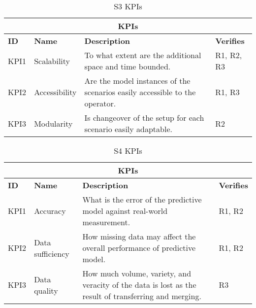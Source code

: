 \begin{table}[hbt!]
\centering
\begin{tabularx}{\textwidth}{|p{1cm}|p{2cm}|X|p{2cm}|}
\hline
\multicolumn{4}{|c|}{\textbf{KPIs}} \\ 
\hline
\textbf{ID} & \textbf{Name} & \textbf{Description} & \textbf{Verifies} \\ 
\hline
KPI1 & Scalability & To what extent are the additional space and time bounded. & R1, R2, R3 \\ 
\hline
KPI2 & Accessibility & Are the model instances of the scenarios easily accessible to the operator. & R1, R3 \\ 
\hline
KPI3 & Modularity & Is changeover of the setup for each scenario easily adaptable. & R2 \\ 
\hline
\end{tabularx}
\caption{S3 KPIs}
\label{tab:s3kpi}
\end{table}

\begin{table}[hbt!]
\centering
\begin{tabularx}{\textwidth}{|p{1cm}|p{2.5cm}|X|p{1.5cm}|}
\hline
\multicolumn{4}{|c|}{\textbf{KPIs}} \\ 
\hline
\textbf{ID} & \textbf{Name} & \textbf{Description} & \textbf{Verifies} \\ 
\hline
KPI1 & Accuracy & What is the error of the predictive model against real-world measurement. & R1, R2 \\ 
\hline
KPI2 & Data sufficiency & How missing data may affect the overall performance of predictive model. & R1, R2 \\ 
\hline
KPI3 & Data quality & How much volume, variety, and veracity of the data is lost as the result of transferring
and merging. & R3 \\ 
\hline
\end{tabularx}
\caption{S4 KPIs}
\label{tab:s4kpi}
\end{table}

\newpage
